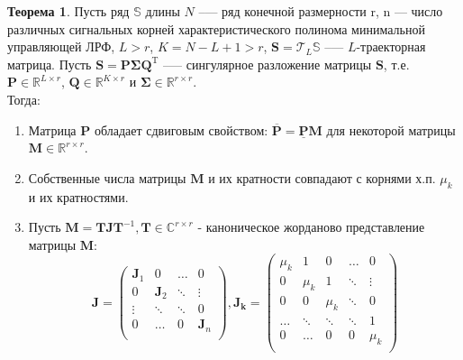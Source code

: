 \documentclass[specialist,
               substylefile = spbu_report.rtx,
               subf,href,colorlinks=true, 12pt]{disser}
\theoremstyle{definition}
\newtheorem{theorem}{Теорема}
\begin{document}
\begin{theorem}
\label{th4}
Пусть ряд $\mathbb{S}$ длины $N$ --— ряд конечной размерности r, n --- число различных сигнальных корней характеристического полинома минимальной управляющей ЛРФ, $L > r$, $K = N - L + 1 > r$, $\mathbf{S} = \mathcal{T}_L\mathbb{S}$ --— $L$-траекторная матрица. Пусть $\mathbf{S} = \mathbf{P\Sigma Q}^{\mathrm{T}}$ --— сингулярное разложение матрицы $\mathbf{S}$, т.е. $\mathbf{P} \in \mathbb{R}^{L \times r}$, $\mathbf{Q} \in \mathbb{R}^{K \times r}$ и $\mathbf{\Sigma} \in \mathbb{R}^{r \times r}$. \\
    \hspace*{0.5cm} Тогда:
    \begin{enumerate}
        \item Матрица $\mathbf{P}$ обладает сдвиговым свойством: $\overline{\mathbf{P}} = \underline{\mathbf{P}}\mathbf{M}$ для некоторой матрицы $\mathbf{M} \in \mathbb{R}^{r \times r}$.
        \item Собственные числа матрицы $\mathbf{M}$ и их кратности совпадают с корнями х.п. $\mu_k$ и их кратностями.
        \item Пусть $\mathbf{M} = \mathbf{TJ}\mathbf{T}^{-1}, \mathbf{T} \in \mathbb{C}^{r \times r}$ - каноническое жорданово представление матрицы $\mathbf{M}$:
        \begin{equation*}
            \mathbf{J} = \begin{pmatrix}
                    \mathbf{J}_1 & 0 & \ldots & 0\\
                    0 & \mathbf{J}_2 & \ddots & \vdots \\
                    \vdots & \ddots & \ddots & 0 \\
                    0 & \ldots & 0 & \mathbf{J}_n \\
                    \end{pmatrix},
            \mathbf{J_k} =         \begin{pmatrix}
                    \mu_k & 1 & 0 & \ldots & 0 \\
                    0 & \mu_k & 1 & \ddots & \vdots \\
                    0 & 0 & \mu_k & \ddots & 0 \\
                    \ldots & \ddots & \ddots & \ddots & 1 \\
                    0 & \ldots & 0 & 0 & \mu_k \\
                    \end{pmatrix}
        \end{equation*}

\end{enumerate}
\end{theorem}
\end{document}

